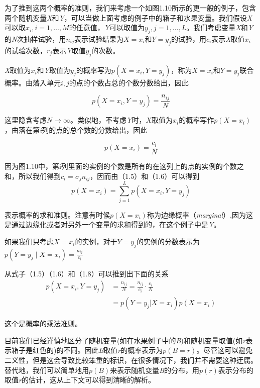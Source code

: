 	为了推到这两个概率的准则，我们来考虑一个如图1.10所示的更一般的例子，包含两个随机变量\textit{X}和\textit{Y}，可以当做上面考虑的例子中的箱子和水果变量。我们假设\textit{X}可以取$x_i, i = 1, \dots, M$的任意值，\textit{Y}可以取值为$y_j, j = 1, \dots, L$。我们考虑变量\textit{X}和\textit{Y}的\textit{N}次抽样试验，用$n_{ij}$表示试验结果为$X = x_i$和$Y = y_j$的试验，用$c_i$表示\textit{X}取值$x_i$的试验次数，$r_j$表示\textit{Y}取值$y_j$的次数。
	
	\textit{X}取值为$x_i$和\textit{Y}取值为$y_j$的概率写为$p(X = x_i, Y = y_j)$，称为$X = x_i$和$Y = y_j$联合概率。由落入单元$i,j$的点的个数占总的个数分数给出，因此
	
	\begin{equation}
	p(X = x_i, Y = y_j) = \frac{n_{ij}}{N}
	\end{equation}
	
	这里隐含考虑$N \to \infty$。类似地，不考虑\textit{Y}时，$X$取值为$x_i$的概率写作$p(X = x_i)$，由落在第\textit{i}列的点的总个数的分数给出，因此
	
	\begin{equation}
	p(X = x_i) = \frac{c_i}{N}
	\end{equation}
	
	因为图1.10中，第i列里面的实例的个数是所有的在这列上的点的实例的个数之和，所以我们得到$c_i = \sigma_j n_{ij}$，因而由（1.5）和（1.6）可以得到
	\begin{equation}
	p(X  = x_i) = \sum_{j = 1}^{L} p(X = x_i, Y = y_j)
	\end{equation}
	
	表示概率的求和准则。注意有时候$p(X = x_i)$称为边缘概率（\textit{marginal}）,因为这是通过边缘化或者对另外一个变量的求和得到的，在这个例子中是\textit{Y}。
	
	如果我们只考虑$X = x_i$的实例，对于$Y = y_j$的实例的分数表示为$p(Y = y_j \mid X = x_i) = \frac{n_{ij}}{c_i}$
	
	从式子（1.5）（1.6）和（1.8）可以推到出下面的关系
	\begin{equation}
	\begin{aligned}
	p(X = x_i, Y = y_j) & = \frac{n_{ij}}{N} = \frac{n_{ij}}{c_i} \cdot \frac{c_i}{N}\\
	& = p(Y = y_j | X = x_i)p(X = x_i)
	\end{aligned}
	\end{equation}
	
	这个是概率的乘法准则。
	
	目前我们已经谨慎地区分了随机变量(如在水果例子中的\textit{B})和随机变量取值(如\textit{r}表示箱子是红色的)的不同。因此\textit{B}取值\textit{r}的概率表示为$p(B = r)$。尽管这可以避免二义性，但是这会导致比较笨重的标识，在很多情况下，我们并不需要这种迂腐。替代地，我们可以简单地用$p(B)$来表示随机变量\textit{B}的分布，用$p(r)$表示分布的取值\textit{r}的估计，这从上下文可以得到清晰的解析。
	
